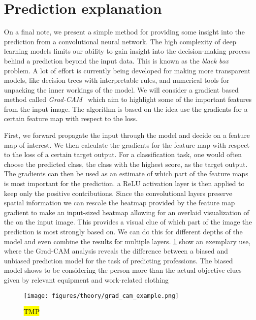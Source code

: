 \section{Prediction explanation}\label{sec:explanation}
On a final note, we present a simple method for providing some insight into the prediction from a convolutional neural network. The high complexity of deep learning models limits our ability to gain insight into the decision-making process behind a prediction beyond the input data. This is known as the \textit{black box} problem. A lot of effort is currently being developed for making more transparent models, like decision trees with interpretable rules, and numerical tools for unpacking the inner workings of the model. We will consider a gradient based method called \textit{Grad-CAM}~\cite{Selvaraju_2019} which aim to highlight some of the important features from the input image. The algorithm is based on the idea use the gradients for a certain feature map with respect to the loss. 

First, we forward propagate the input through the model and decide on a feature
map of interest. We then calculate the gradients for the feature map with
respect to the loss of a certain target output. For a classification task, one
would often choose the predicted class, the class with the highest score, as the
target output. The gradients can then be used as an estimate of which part of
the feature maps is most important for the prediction. a ReLU activation layer
is then applied to keep only the positive contributions. Since the convolutional
layers preserve spatial information we can rescale the heatmap provided by the
feature map gradient to make an input-sized heatmap allowing for an overlaid
visualization of the on the input image. This provides a visual clue of which
part of the image the prediction is most strongly based on. We can do this for
different depths of the model and even combine the results for multiple layers.
\cref{fig:grad_cam_example} show an exemplary use, where the Grad-CAM analysis reveals the difference between a biased and unbiased prediction model for the task of predicting professions. The biased model shows to be considering the person more than the actual objective clues given by relevant equipment and work-related clothing


\begin{figure}[H]
  \centering
  \texttt{[image: figures/theory/grad\_cam\_example.png]}
  \caption{\hl{TMP}~\cite{Selvaraju_2019} }
  \label{fig:grad_cam_example}
\end{figure}


